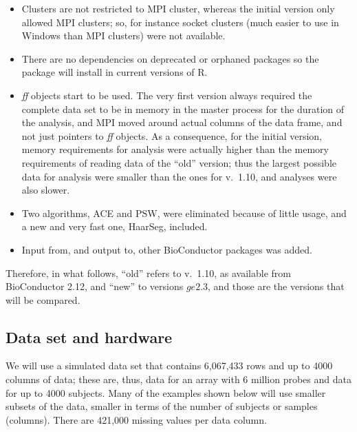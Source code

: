 \documentclass[a4paper,11pt]{article}
\begin{document}
\begin{itemize}

\item Clusters are not restricted to MPI cluster, whereas the initial
  version only allowed MPI clusters; so, for instance socket clusters
  (much easier to use in Windows than MPI clusters) were not available.

\item There are no dependencies on deprecated or orphaned packages so the
  package will install in current versions of R.

\item \textit{ff} objects start to be used. The very first version always
  required the complete data set to be in memory in the master process for
  the duration of the analysis, and MPI moved around actual columns of the
  data frame, and not just pointers to \textit{ff} objects. As a
  consequence, for the initial version, memory requirements for analysis
  were actually higher than the memory requirements of reading data of the
  ``old'' version; thus the largest possible data for analysis were
  smaller than the ones for v.\ 1.10, and analyses were also  slower.
\item Two algorithms, ACE and PSW, were eliminated because of little
  usage, and a new and very fast one, HaarSeg, included.
\item Input from, and output to, other BioConductor packages was added. 
\end{itemize}

Therefore, in what follows, ``old'' refers to v.\ 1.10, as available from
BioConductor 2.12, and ``new'' to versions $ge 2.3$, and those are the
versions that will be compared. 


\subsection{Data set and hardware}
\label{sec:data-set-hardware}

We will use a simulated data set that contains 6,067,433 rows and up to
4000 columns of data; these are, thus, data for an array with 6 million
probes and data for up to 4000 subjects. Many of the examples shown below
will use smaller subsets of the data, smaller in terms of the number of
subjects or samples (columns). There are 421,000 missing values per data
column. 
\end{document}
